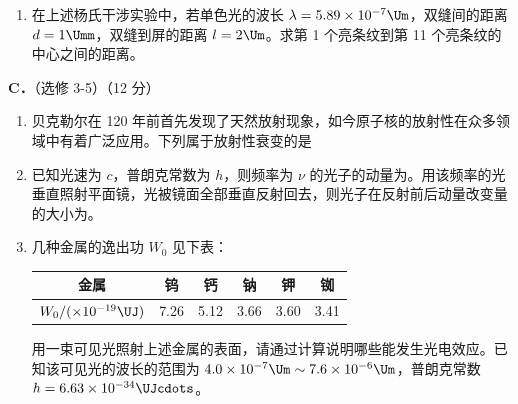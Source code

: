 \documentclass[\gkver]{gaokaozhenti}
\begin{document}
\begin{enumerate}
\begin{enumerate}
	\onepicture[num=c, label=2016江苏理综12c, align=right, h=4.45cm]{}
	\item
	在上述杨氏干涉实验中，若单色光的波长 $\lambda=5.89\times10^{-7}\Um$，双缝间的距离 $d=1\Umm$，双缝到屏的距离 $l=2\Um$。求第 1 个亮条纹到第 11 个亮条纹的中心之间的距离。
\end{enumerate}

\textbf{C．}（选修 3-5）（12 分）

\begin{enumerate}
	\item
	贝克勒尔在 120 年前首先发现了天然放射现象，如今原子核的放射性在众多领域中有着广泛应用。下列属于放射性衰变的是

	{}
	{}
	{}
	\item
	已知光速为 $c$，普朗克常数为 $h$，则频率为 $\nu$ 的光子的动量为。用该频率的光垂直照射平面镜，光被镜面全部垂直反射回去，则光子在反射前后动量改变量的大小为。
	\item
	几种金属的逸出功 $W_{0}$ 见下表：

	\begin{center}
	\begin{tabular}{|c|c|c|c|c|c|}
	\hline
	金属 & 钨 & 钙 & 钠 & 钾 & 铷 \\
	\hline
	$W_{0}/(\times10^{-19}\UJ)$ & 7.26 & 5.12 & 3.66 & 3.60 & 3.41 \\
	\hline
	\end{tabular}
	\end{center}

	用一束可见光照射上述金属的表面，请通过计算说明哪些能发生光电效应。已知该可见光的波长的范围为 $4.0\times10^{-7}\Um\sim7.6\times10^{-6}\Um$，普朗克常数 $h=6.63\times10^{-34}\UJcdots$。
\end{enumerate}
\end{enumerate}
\end{document}
